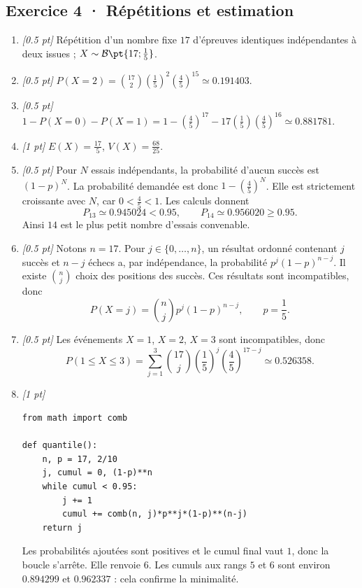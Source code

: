 \subsection*{Exercice 4 · Répétitions et estimation}\begin{enumerate}

\item \textit{[\num{0,5} pt]} Répétition d'un nombre fixe $17$ d'épreuves identiques indépendantes à deux issues ; $X\sim\mathcal B\pt{17;\frac{1}{5}}$.

\item \textit{[\num{0,5} pt]} $P(X=2)=\binom{17}2(\frac{1}{5})^2(\frac{4}{5})^{15}\simeq\num{0,191403}$.

\item \textit{[\num{0,5} pt]} $1-P(X=0)-P(X=1)=1-(\frac{4}{5})^{17}-17(\frac{1}{5})(\frac{4}{5})^{16}\simeq\num{0,881781}$.

\item \textit{[1 pt]} $E(X)=\frac{17}{5}$, $V(X)=\frac{68}{25}$.

\item \textit{[\num{0,5} pt]} Pour $N$ essais indépendants, la probabilité d'aucun succès est $(1-p)^N$. La probabilité demandée est donc $1-(\frac{4}{5})^N$. Elle est strictement croissante avec $N$, car $0<\frac{4}{5}<1$. Les calculs donnent
\[P_{13}\simeq\num{0,945024}<\num{0,95},\qquad P_{14}\simeq\num{0,956020}\ge\num{0,95}.\]
Ainsi $14$ est le plus petit nombre d'essais convenable.

\item \textit{[\num{0,5} pt]} Notons $n=17$. Pour $j\in\{0,\ldots,n\}$, un résultat ordonné contenant $j$ succès et $n-j$ échecs a, par indépendance, la probabilité $p^j(1-p)^{n-j}$. Il existe $\binom nj$ choix des positions des succès. Ces résultats sont incompatibles, donc
\[P(X=j)=\binom nj p^j(1-p)^{n-j},\qquad p=\frac{1}{5}.\]

\item \textit{[\num{0,5} pt]} Les événements $X=1$, $X=2$, $X=3$ sont incompatibles, donc
\[P(1\le X\le3)=\sum_{j=1}^3\binom{17}j(\frac{1}{5})^j(\frac{4}{5})^{17-j}\simeq\num{0,526358}.\]


\item \textit{[1 pt]} 
\begin{lstlisting}
from math import comb

def quantile():
    n, p = 17, 2/10
    j, cumul = 0, (1-p)**n
    while cumul < 0.95:
        j += 1
        cumul += comb(n, j)*p**j*(1-p)**(n-j)
    return j
\end{lstlisting}
Les probabilités ajoutées sont positives et le cumul final vaut $1$, donc la boucle s'arrête. Elle renvoie $6$. Les cumuls aux rangs $5$ et $6$ sont environ $\num{0,894299}$ et $\num{0,962337}$ : cela confirme la minimalité.

\end{enumerate}

